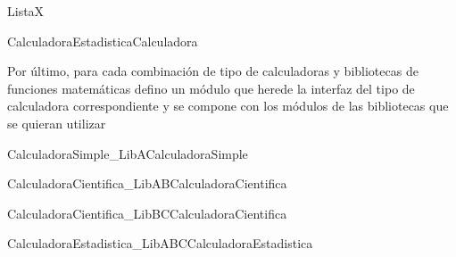 \documentclass[12pt,a4paper,fleqn]{article}
\begin{document}
\begin{gmodule}{Lista}{X}
\eproc
{}
\end{gmodule}


\begin{hmodule}{CalculadoraEstadistica}{Calculadora}
\eproc
{}
\end{hmodule}

Por último, para cada combinación de tipo de calculadoras y bibliotecas de funciones
matemáticas defino un módulo que herede la interfaz del tipo de calculadora
correspondiente y se compone con los módulos de las bibliotecas que se quieran utilizar

\begin{hmodule}{CalculadoraSimple\_LibA}{CalculadoraSimple}
\end{hmodule}

\begin{hmodule}{CalculadoraCientifica\_LibAB}{CalculadoraCientifica}
\end{hmodule}

\begin{hmodule}{CalculadoraCientifica\_LibBC}{CalculadoraCientifica}
\end{hmodule} 

\begin{hmodule}{CalculadoraEstadistica\_LibABC}{CalculadoraEstadistica}
\end{hmodule} 
\end{document}
